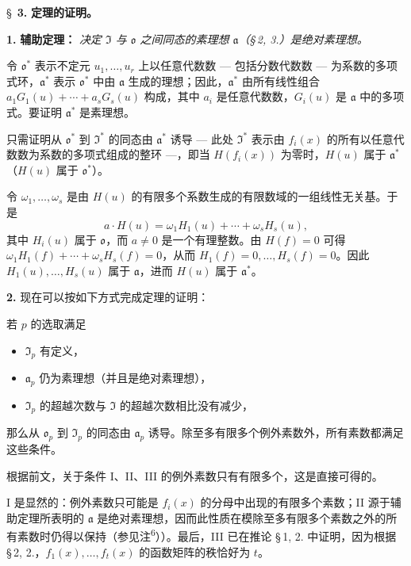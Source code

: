 \bigskip
\S~\textbf{3.}
\textbf{定理的证明。}

\smallskip

\noindent\textbf{1.} \textbf{辅助定理：}
\textit{决定 $\mathfrak{I}$ 与 $\mathfrak{o}$ 之间同态的素理想 $\mathfrak{a}$（\S\,2, 3.）是绝对素理想。}

令 $\mathfrak{o}^*$ 表示不定元 $u_1,\ldots,u_r$ 上以任意代数数 --- 包括分数代数数 --- 为系数的多项式环，$\mathfrak{a}^*$ 表示 $\mathfrak{o}^*$ 中由 $\mathfrak{a}$ 生成的理想；因此，$\mathfrak{a}^*$ 由所有线性组合 $a_1 G_1(u) + \cdots + a_s G_s(u)$ 构成，其中 $a_i$ 是任意代数数，$G_i(u)$ 是 $\mathfrak{a}$ 中的多项式。要证明 $\mathfrak{a}^*$ 是素理想。

只需证明从 $\mathfrak{o}^*$ 到 $\mathfrak{I}^*$ 的同态由 $\mathfrak{a}^*$ 诱导 --- 此处 $\mathfrak{I}^*$ 表示由 $f_i(x)$ 的所有以任意代数数为系数的多项式组成的整环 ---，即当 $H(f_i(x))$ 为零时，$H(u)$ 属于 $\mathfrak{a}^*$（$H(u)$ 属于 $\mathfrak{o}^*$）。

令 $\omega_1,\ldots,\omega_s$ 是由 $H(u)$ 的有限多个系数生成的有限数域的一组线性无关基。于是
\[
a \cdot H(u) = \omega_1 H_1(u) + \cdots + \omega_s H_s(u),
\]
其中 $H_i(u)$ 属于 $\mathfrak{o}$，而 $a \neq 0$ 是一个有理整数。由 $H(f) = 0$ 可得 $\omega_1 H_1(f) + \cdots + \omega_s H_s(f) = 0$，从而 $H_1(f) = 0,\ldots, H_s(f) = 0$。因此 $H_1(u),\ldots,H_s(u)$ 属于 $\mathfrak{a}$，进而 $H(u)$ 属于 $\mathfrak{a}^*$。

\medskip\noindent\textbf{2.}
现在可以按如下方式完成定理的证明：

若 $p$ 的选取满足
\begin{itemize}
\item[I.] $\mathfrak{I}_p$ 有定义，
\item[II.] $\mathfrak{a}_p$ 仍为素理想（并且是绝对素理想），
\item[III.] $\mathfrak{I}_p$ 的超越次数与 $\mathfrak{I}$ 的超越次数相比没有减少，
\end{itemize}
那么从 $\mathfrak{o}_p$ 到 $\mathfrak{I}_p$ 的同态由 $\mathfrak{a}_p$ 诱导。除至多有限多个例外素数外，所有素数都满足这些条件。

根据前文，关于条件 I、II、III 的例外素数只有有限多个，这是直接可得的。

I 是显然的：例外素数只可能是 $f_i(x)$ 的分母中出现的有限多个素数；II 源于辅助定理所表明的 $\mathfrak{a}$ 是绝对素理想，因而此性质在模除至多有限多个素数之外的所有素数时仍得以保持（参见注\textsuperscript{6}））。最后，III 已在推论 \S\,1, 2. 中证明，因为根据 \S\,2, 2.，$f_1(x),\ldots,f_t(x)$ 的函数矩阵的秩恰好为 $t$。

